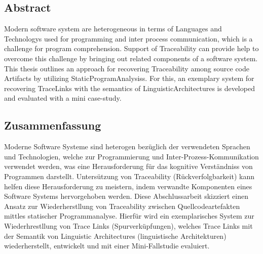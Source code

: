 
\subsection*{Abstract}
Modern software system are heterogeneous in terms of \glspl{Language} and \glspl{Technology} used for programming and inter process communication, which is a challenge for program comprehension.
Support of \gls{Traceability} can provide help to overcome this challenge by bringing out related components of a software system.
This thesis outlines an approach for recovering \gls{Traceability} among source code \glspl{Artifact} by utilizing \glspl{StaticProgramAnalysis}.
For this, an exemplary system for recovering \glspl{TraceLink} with the semantics of \glspl{LinguisticArchitecture} is developed and evaluated with a mini case-study.

\subsection*{Zusammenfassung}
Moderne Software Systeme sind heterogen bezüglich der verwendeten Sprachen und Technologien, welche zur Programmierung und Inter-Prozess-Kommunikation verwendet werden, was eine Herausforderung für das kognitive Verständniss von Programmen darstellt.
Untersützung von \Gls{Traceability} (Rückverfolgbarkeit) kann helfen diese Herausforderung zu meistern, indem verwandte Komponenten eines Software Systems hervorgehoben werden.
Diese Abschlussarbeit skizziert einen Ansatz zur Wiederherstllung von \Gls{Traceability} zwischen Quellcodeartefakten mittles statischer Programmanalyse.
Hierfür wird ein exemplarisches System zur Wiederhrestllung von Trace Links (Spurverküpfungen), welches Trace Links mit der Semantik von Linguistic Architectures (linguistische Architekturen) wiederherstellt, entwickelt und mit einer Mini-Fallstudie evaluiert.
